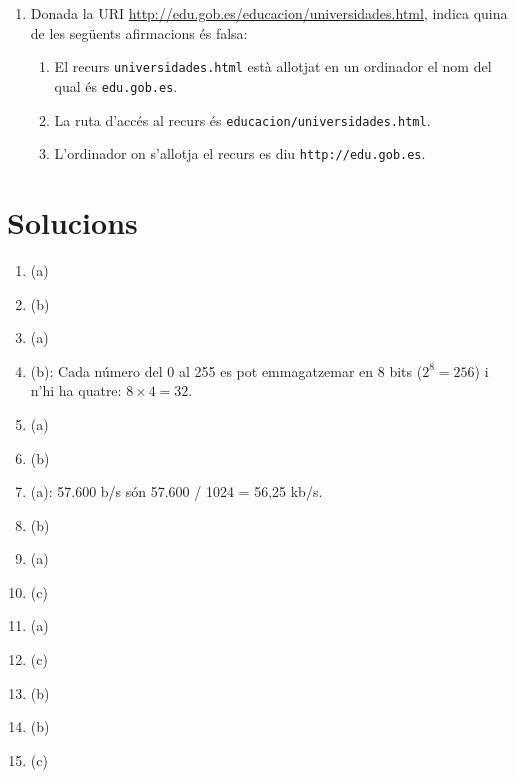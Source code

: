 \begin{enumerate}
\item Donada la URI
  \url{http://edu.gob.es/educacion/universidades.html}, indica quina
  de les següents afirmacions és falsa:
  \begin{enumerate}
  \item El recurs \texttt{universidades.html} està allotjat en un
    ordinador el nom del qual és \texttt{edu.gob.es}.
  \item La ruta d'accés al recurs és
    \texttt{educacion/universidades.html}.
  \item L'ordinador on s'allotja el recurs es diu
    \texttt{http://edu.gob.es}.
  \end{enumerate}
\end{enumerate}

\section{Solucions}
\begin{enumerate}
\item (a)
\item (b)
\item (a)
\item (b): Cada número del 0 al 255 es pot emmagatzemar en 8 bits
  ($2^8=256$) i n'hi ha quatre: $8\times 4=32$.
\item (a)
\item (b)
\item (a): 57.600 b/s són  57.600 / 1024 = 56,25 kb/s.
\item (b)
\item (a)
\item (c)
\item (a)
\item (c)
\item (b)
\item (b)
\item (c)
\end{enumerate}
